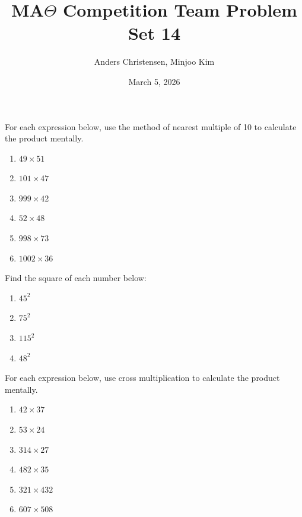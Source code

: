 \documentclass[12pt]{article}
\newenvironment{problem}[2][Problem]{\begin{trivlist}
\item[\hskip \labelsep {\bfseries #1}\hskip \labelsep {\bfseries #2.}]}{\end{trivlist}}
\begin{document}
\title{MA$\Theta$ Competition Team  Problem Set 14}
\author{Anders Christensen, Minjoo Kim}
\date{March 5, 2026}
\maketitle
\begin{problem}{1}
  For each expression below, use the method of nearest multiple of 10 to calculate the product mentally.
\begin{enumerate}
\item $49 \times 51$
\item $101 \times 47$
\item $999 \times 42$
\item $52 \times 48$
\item $998 \times 73$
\item $1002 \times 36$
\end{enumerate}
\end{problem}

\begin{problem}{2}
  Find the square of each number below:
\begin{enumerate}
\item $45^2$
\item $75^2$
\item $115^2$
\item $48^2$
\end{enumerate}
\end{problem}

\begin{problem}{3}
  For each expression below, use cross multiplication to calculate the product mentally.
\begin{enumerate}
\item $42 \times 37$
\item $53 \times 24$
\item $314 \times 27$
\item $482 \times 35$
\item $321 \times 432$
\item $607 \times 508$
\end{enumerate}
\end{problem}
\end{document}
